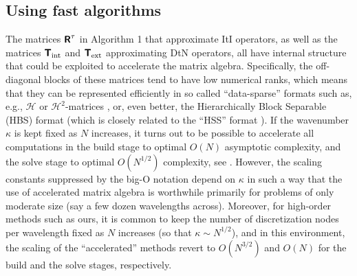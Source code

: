 \documentclass[11pt,final]{amsart}
\theoremstyle{definition}
\numberwithin{remark}{section}
\numberwithin{definition}{section}
\numberwithin{pro}{section}
\begin{document}
\subsection{Using fast algorithms}
\label{sec:N}
The matrices $\bm{\mathsf{R}}^{\tau}$ in Algorithm 1 that approximate ItI operators, as well as the matrices
$\bm{\mathsf{T}}_{\rm int}$ and $\bm{\mathsf{T}}_{\rm ext}$ approximating DtN operators, all have internal structure
that could be exploited to accelerate the matrix algebra. Specifically, the off-diagonal blocks of these
matrices tend to have low numerical ranks, which means that they can be represented efficiently in so
called ``data-sparse'' formats such as, e.g., $\mathcal{H}$ or $\mathcal{H}^{2}$-matrices \cite{hackbusch,2010_borm_book,2008_bebendorf_book},
or, even better, the Hierarchically Block Separable (HBS) format
\cite{2012_martinsson_FDS_survey,2012_ho_greengard_fastdirect}
(which is closely related to the ``HSS'' format \cite{2010_gu_xia_HSS}).
If the wavenumber $\kappa$ is kept fixed as $N$ increases, it turns out to be possible to accelerate
all computations in the build stage to optimal $O(N)$ asymptotic complexity, and the solve stage
to optimal $O(N^{1/2})$ complexity, see  \cite{ONspectralcomposite}.
However, the scaling constants suppressed by the big-O notation depend on $\kappa$ in such a way
that the use of accelerated matrix algebra is worthwhile primarily for problems of only moderate size (say a few
dozen wavelengths across). Moreover, for high-order methods such as ours, it is common to keep
the number of discretization nodes per wavelength fixed as $N$ increases (so that $\kappa \sim N^{1/2}$),
and in this environment, the scaling of the ``accelerated'' methods revert to $O(N^{3/2})$ and $O(N)$ for the build and the
solve stages, respectively.


\end{document}
